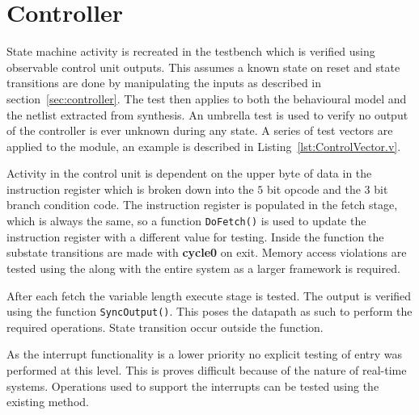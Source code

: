 
\section{Controller}

State machine activity is recreated in the testbench which is verified using observable control unit outputs.
This assumes a known state on reset and state transitions are done by manipulating the inputs as described in section~\ref{sec:controller}.  
The test then applies to both the behavioural model and the netlist extracted from synthesis.
An umbrella test is used to verify no output of the controller is ever unknown during any state.
A series of test vectors are applied to the module, an example is described in Listing~\ref{lst:ControlVector.v}.




Activity in the control unit is dependent on the upper byte of data in the instruction register which is broken down into the $5$ bit opcode and the $3$ bit branch condition code.  
The instruction register is populated in the fetch stage, which is always the same, so a function \texttt{DoFetch()} is used to update the instruction register with a different value for testing.
Inside the function the substate transitions are made with \textbf{cycle0} on exit.
Memory access violations are tested using the along with the entire system as a larger framework is required.

After each fetch the variable length execute stage is tested.
The output is verified using the function \texttt{SyncOutput()}. 
This poses the datapath as such to perform the required operations.
State transition occur outside the function.

As the interrupt functionality is a lower priority no explicit testing of entry was performed at this level.
This is proves difficult because of the nature of real-time systems.
Operations used to support the interrupts can be tested using the existing method. 
